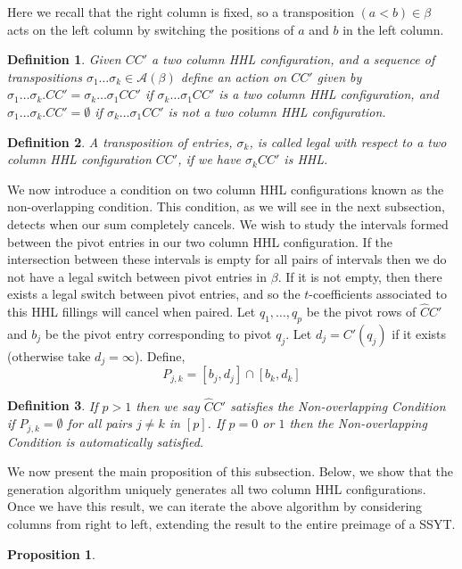 \documentclass[11pt]{amsart}
\newtheorem{prop}{Proposition}[section]
\newtheorem{definition}{Definition}[section]
\begin{document}
{Here we recall that the right column is fixed, so a transposition $(a<b) \in \beta$ acts on the left column by switching the positions of $a$ and $b$ in the left column. 
\begin{definition}
Given $CC'$ a two column HHL configuration, and a sequence of transpositions $\sigma_{1}\ldots \sigma_{k}\in \mathcal{A}(\beta)$ define an action on $CC'$ given by $\sigma_{1}\ldots \sigma_{k}.CC'=\sigma_{k}\ldots \sigma_{1}CC'$ if $\sigma_{k}\ldots \sigma_{1}CC'$ is a two column HHL configuration, and $\sigma_{1}\ldots \sigma_{k}.CC'=\emptyset$ if $\sigma_{k}\ldots \sigma_{1}CC'$ is not  a two column HHL configuration. 
\end{definition}
\begin{definition}
A transposition of entries, $\sigma_{k}$, is called \emph{legal} with respect to a two column HHL configuration $CC'$, if we have $\sigma_{k}CC'$ is HHL.  
\end{definition}
\indent We now introduce a condition on two column HHL configurations known as the non-overlapping condition. This condition, as we will see in the next subsection, detects when our sum completely cancels. We wish to study the intervals formed between the pivot entries in our two column HHL configuration. If the intersection between these intervals is empty for all pairs of intervals then we do not have a legal switch between pivot entries in $\beta$. If it is not empty, then there exists a legal switch between pivot entries, and so the $t$-coefficients associated to this HHL fillings will cancel when paired. 
\newline\indent Let $q_{1},\ldots, q_{p}$ be the pivot rows of $\widehat{C}C'$ and $b_{j}$ be the pivot entry corresponding to pivot $q_{j}$. Let $d_{j}=C'(q_{j})$ if it exists (otherwise take $d_{j}=\infty$). Define,
\[
P_{j,k}=[b_{j},d_{j}] \cap [b_{k},d_{k}]
\]
\begin{definition}If $p>1$ then we say $\widehat{C}C'$ satisfies the \emph{Non-overlapping Condition} if $P_{j,k}=\emptyset$ for all pairs $j \neq k$ in $[p]$. If $p=0$ or $1$ then the \emph{Non-overlapping Condition} is automatically satisfied. 
\end{definition}
We now present the main proposition of this subsection. Below, we show that the generation algorithm uniquely generates all two column HHL configurations. Once we have this result, we can iterate the above algorithm by considering columns from right to left, extending the result to the entire preimage of a SSYT. 
\begin{prop}

\end{prop}}
\end{document}
